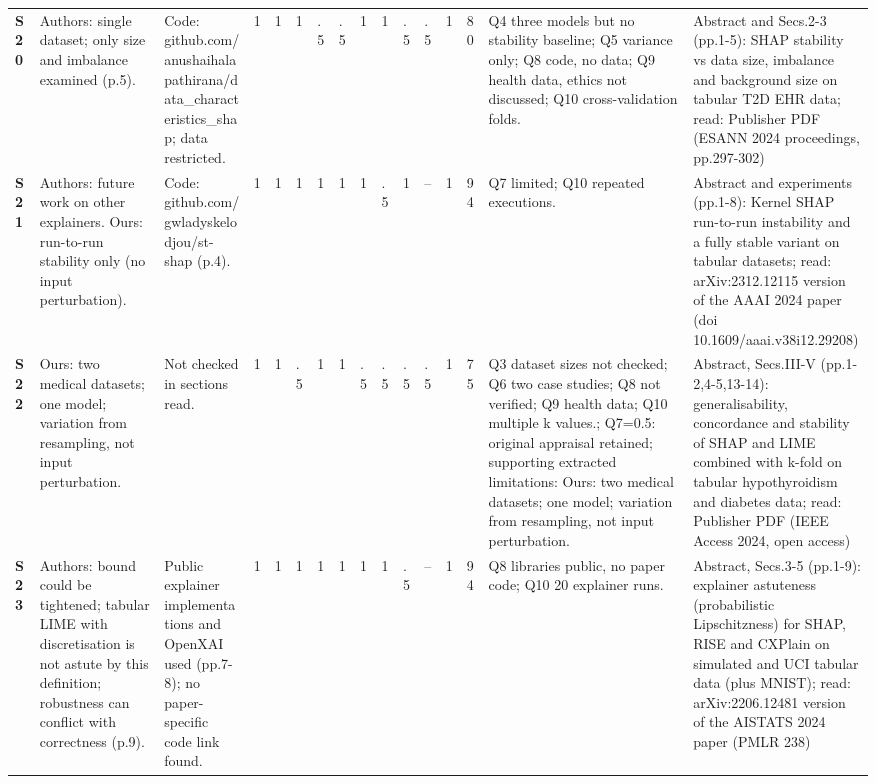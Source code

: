\begin{longtable}{@{}P{1.0cm}P{4.6cm}P{3.6cm}P{0.3cm}P{0.3cm}P{0.3cm}P{0.3cm}P{0.3cm}P{0.3cm}P{0.3cm}P{0.3cm}P{0.3cm}P{0.36cm}P{0.75cm}P{3.0cm}P{3.9cm}@{}}
\textbf{S20} & Authors: single dataset; only size and imbalance examined (p.5). & Code: github.com/\allowbreak{}anushaihalapathirana/\allowbreak{}data\_\allowbreak{}characteristics\_\allowbreak{}shap; data restricted. & 1 & 1 & 1 & .5 & .5 & 1 & 1 & .5 & .5 & 1 & 80 & Q4 three models but no stability baseline; Q5 variance only; Q8 code, no data; Q9 health data, ethics not discussed; Q10 cross-validation folds. & Abstract and Secs.2-3 (pp.1-5): SHAP stability vs data size, imbalance and background size on tabular T2D EHR data; read: Publisher PDF (ESANN 2024 proceedings, pp.297-302) \\
\textbf{S21} & Authors: future work on other explainers. Ours: run-to-run stability only (no input perturbation). & Code: github.com/\allowbreak{}gwladyskelodjou/\allowbreak{}st-shap (p.4). & 1 & 1 & 1 & 1 & 1 & 1 & .5 & 1 & -- & 1 & 94 & Q7 limited; Q10 repeated executions. & Abstract and experiments (pp.1-8): Kernel SHAP run-to-run instability and a fully stable variant on tabular datasets; read: arXiv:2312.12115 version of the AAAI 2024 paper (doi 10.1609/\allowbreak{}aaai.v38i12.29208) \\
\textbf{S22} & Ours: two medical datasets; one model; variation from resampling, not input perturbation. & Not checked in sections read. & 1 & 1 & .5 & 1 & 1 & .5 & .5 & .5 & .5 & 1 & 75 & Q3 dataset sizes not checked; Q6 two case studies; Q8 not verified; Q9 health data; Q10 multiple k values.; Q7=0.5: original appraisal retained; supporting extracted limitations: Ours: two medical datasets; one model; variation from resampling, not input perturbation. & Abstract, Secs.III-V (pp.1-2,4-5,13-14): generalisability, concordance and stability of SHAP and LIME combined with k-fold on tabular hypothyroidism and diabetes data; read: Publisher PDF (IEEE Access 2024, open access) \\
\textbf{S23} & Authors: bound could be tightened; tabular LIME with discretisation is not astute by this definition; robustness can conflict with correctness (p.9). & Public explainer implementations and OpenXAI used (pp.7-8); no paper-specific code link found. & 1 & 1 & 1 & 1 & 1 & 1 & 1 & .5 & -- & 1 & 94 & Q8 libraries public, no paper code; Q10 20 explainer runs. & Abstract, Secs.3-5 (pp.1-9): explainer astuteness (probabilistic Lipschitzness) for SHAP, RISE and CXPlain on simulated and UCI tabular data (plus MNIST); read: arXiv:2206.12481 version of the AISTATS 2024 paper (PMLR 238) \\

\end{longtable}
